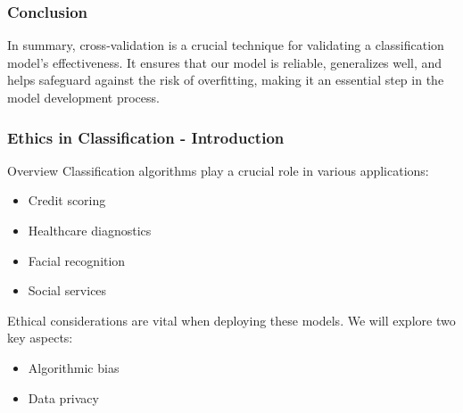 \documentclass[aspectratio=169]{beamer}
\begin{document}
\begin{frame}[fragile]
    \frametitle{Conclusion}
    In summary, cross-validation is a crucial technique for validating a classification model’s effectiveness. It ensures that our model is reliable, generalizes well, and helps safeguard against the risk of overfitting, making it an essential step in the model development process.
\end{frame}

\begin{frame}[fragile]
    \frametitle{Ethics in Classification - Introduction}
    \begin{block}{Overview}
        Classification algorithms play a crucial role in various applications:
        \begin{itemize}
            \item Credit scoring
            \item Healthcare diagnostics
            \item Facial recognition
            \item Social services
        \end{itemize}
        Ethical considerations are vital when deploying these models. We will explore two key aspects:
        \begin{itemize}
            \item Algorithmic bias
            \item Data privacy
        \end{itemize}
    \end{block}
\end{frame}
\end{document}
